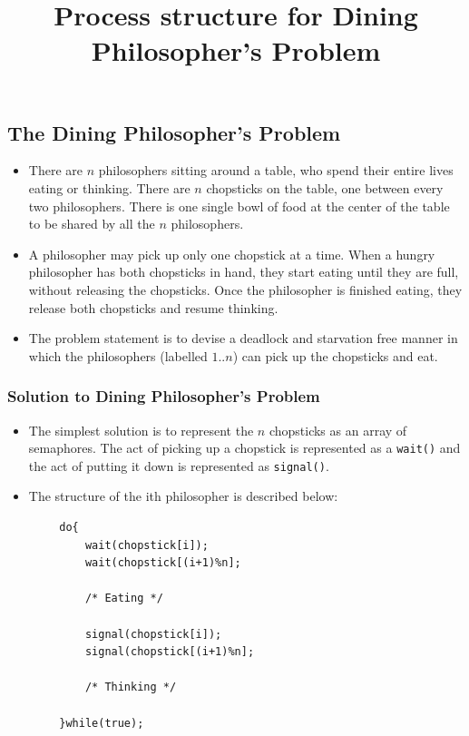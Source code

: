 \documentclass{article}
\theoremstyle{plain}
\theoremstyle{definition}
\begin{document}
\subsection{The Dining Philosopher's Problem}
\begin{itemize}
    \item There are $n$ philosophers sitting around a table, who spend their entire lives eating or thinking. There are $n$ chopsticks on the table, one between every two philosophers. There is one single bowl of food at the center of the table to be shared by all the $n$ philosophers.
    
    \item A philosopher may pick up only one chopstick at a time. When a hungry philosopher has both chopsticks in hand, they start eating until they are full, without releasing the chopsticks. Once the philosopher is finished eating, they release both chopsticks and resume thinking.
    
    \item The problem statement is to devise a deadlock and starvation free manner in which the philosophers (labelled $1..n$) can pick up the chopsticks and eat. 
\end{itemize}

\subsubsection{Solution to Dining Philosopher's Problem}
\begin{itemize}
    \item The simplest solution is to represent the $n$ chopsticks as an array of semaphores. The act of picking up a chopstick is represented as a \texttt{wait()} and the act of putting it down is represented as \texttt{signal()}.
    
    \item The structure of the ith philosopher is described below:
\end{itemize}

\begin{listing}[!h]
    \begin{verbatim}
        do{
            wait(chopstick[i]);
            wait(chopstick[(i+1)%n];
            
            /* Eating */
            
            signal(chopstick[i]);
            signal(chopstick[(i+1)%n];
            
            /* Thinking */
            
        }while(true);
    \end{verbatim}
    \title{Process structure for Dining Philosopher's Problem}
\end{listing}
\end{document}
